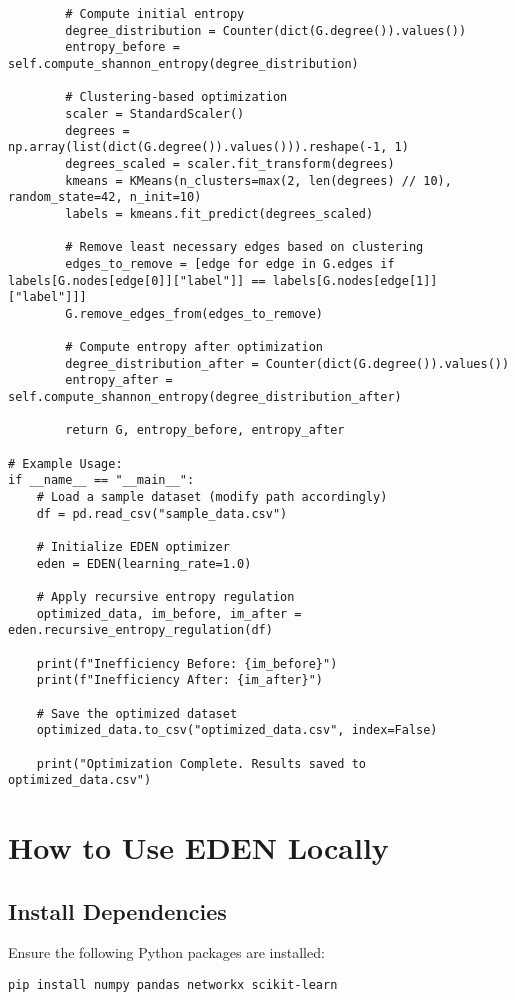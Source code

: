 \documentclass{article}
\begin{document}
\begin{verbatim}
        # Compute initial entropy
        degree_distribution = Counter(dict(G.degree()).values())
        entropy_before = self.compute_shannon_entropy(degree_distribution)

        # Clustering-based optimization
        scaler = StandardScaler()
        degrees = np.array(list(dict(G.degree()).values())).reshape(-1, 1)
        degrees_scaled = scaler.fit_transform(degrees)
        kmeans = KMeans(n_clusters=max(2, len(degrees) // 10), random_state=42, n_init=10)
        labels = kmeans.fit_predict(degrees_scaled)

        # Remove least necessary edges based on clustering
        edges_to_remove = [edge for edge in G.edges if labels[G.nodes[edge[0]]["label"]] == labels[G.nodes[edge[1]]["label"]]]
        G.remove_edges_from(edges_to_remove)

        # Compute entropy after optimization
        degree_distribution_after = Counter(dict(G.degree()).values())
        entropy_after = self.compute_shannon_entropy(degree_distribution_after)

        return G, entropy_before, entropy_after

# Example Usage:
if __name__ == "__main__":
    # Load a sample dataset (modify path accordingly)
    df = pd.read_csv("sample_data.csv")

    # Initialize EDEN optimizer
    eden = EDEN(learning_rate=1.0)

    # Apply recursive entropy regulation
    optimized_data, im_before, im_after = eden.recursive_entropy_regulation(df)

    print(f"Inefficiency Before: {im_before}")
    print(f"Inefficiency After: {im_after}")

    # Save the optimized dataset
    optimized_data.to_csv("optimized_data.csv", index=False)

    print("Optimization Complete. Results saved to optimized_data.csv")
\end{verbatim}

\section{How to Use EDEN Locally}

\subsection{Install Dependencies}
Ensure the following Python packages are installed:
\begin{verbatim}
pip install numpy pandas networkx scikit-learn
\end{verbatim}
\end{document}

